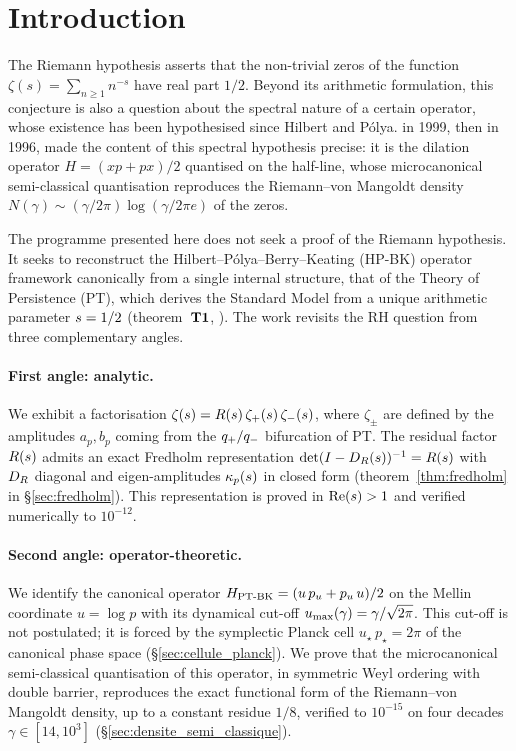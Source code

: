 \section{Introduction}
\label{sec:intro}

The Riemann hypothesis asserts that the non-trivial zeros of the function
$\zeta(s) = \sum_{n \ge 1} n^{-s}$ have real part $1/2$. Beyond its
arithmetic formulation, this conjecture is also a question about the
spectral nature of a certain operator, whose existence has been
hypothesised since Hilbert and P\'olya. \textcite{BerryKeating1999} in 1999,
then \textcite{Connes1996} in 1996, made the content of this spectral
hypothesis precise: it is the dilation operator
$H = (xp + px)/2$ quantised on the half-line, whose microcanonical
semi-classical quantisation reproduces the Riemann--von Mangoldt density
$N(\gamma) \sim (\gamma/2\pi) \log(\gamma / 2\pi e)$
of the zeros.

The programme presented here does not seek a proof of the Riemann
hypothesis. It seeks to reconstruct the Hilbert--P\'olya--Berry--Keating
(HP-BK) operator framework canonically from a single internal structure,
that of the Theory of Persistence (PT), which derives the Standard Model
from a unique arithmetic parameter $s = 1/2$
(theorem~$\textbf{T1}$, \cite{PT_M1}). The work revisits the RH question from
three complementary angles.

\paragraph{First angle: analytic.}
We exhibit a factorisation
$\zeta(s) = R(s)\,\zeta_{+}(s)\,\zeta_{-}(s)$, where $\zeta_\pm$ are
defined by the amplitudes $a_p, b_p$ coming from the $q_{+}/q_{-}$
bifurcation of PT. The residual factor $R(s)$ admits an exact Fredholm
representation $\det(I - D_R(s))^{-1} = R(s)$ with $D_R$ diagonal
and eigen-amplitudes $\kappa_p(s)$ in closed form (theorem~\ref{thm:fredholm}
in \S\ref{sec:fredholm}). This representation is proved in $\operatorname{Re}(s) > 1$
and verified numerically to $10^{-12}$.

\paragraph{Second angle: operator-theoretic.}
We identify the canonical operator
$H_{\mathrm{PT\text{-}BK}} = (u\,p_u + p_u\,u)/2$ on the Mellin coordinate $u = \log p$
with its dynamical cut-off
$u_{\max}(\gamma) = \gamma/\sqrt{2\pi}$. This cut-off is not postulated; it
is forced by the symplectic Planck cell $u_\star\,p_\star = 2\pi$
of the canonical phase space (\S\ref{sec:cellule_planck}). We prove that
the microcanonical semi-classical quantisation of this operator, in
symmetric Weyl ordering with double barrier, reproduces the exact
functional form of the Riemann--von Mangoldt density, up to a constant
residue $1/8$, verified to $10^{-15}$ on four decades
$\gamma \in [14, 10^{3}]$ (\S\ref{sec:densite_semi_classique}).

